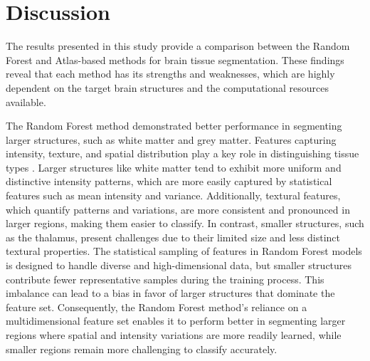\section{Discussion}
The results presented in this study provide a comparison between the Random Forest and Atlas-based methods for brain tissue segmentation. These findings reveal that each method has its strengths and weaknesses, which are highly dependent on the target brain structures and the computational resources available.

The Random Forest method demonstrated better performance in segmenting larger structures, such as white matter and grey matter. Features capturing intensity, texture, and spatial distribution play a key role in distinguishing tissue types \cite{b15}. Larger structures like white matter tend to exhibit more uniform and distinctive intensity patterns, which are more easily captured by statistical features such as mean intensity and variance. Additionally, textural features, which quantify patterns and variations, are more consistent and pronounced in larger regions, making them easier to classify. In contrast, smaller structures, such as the thalamus, present challenges due to their limited size and less distinct textural properties. The statistical sampling of features in Random Forest models is designed to handle diverse and high-dimensional data, but smaller structures contribute fewer representative samples during the training process. This imbalance can lead to a bias in favor of larger structures that dominate the feature set. Consequently, the Random Forest method's reliance on a multidimensional feature set enables it to perform better in segmenting larger regions where spatial and intensity variations are more readily learned, while smaller regions remain more challenging to classify accurately.

